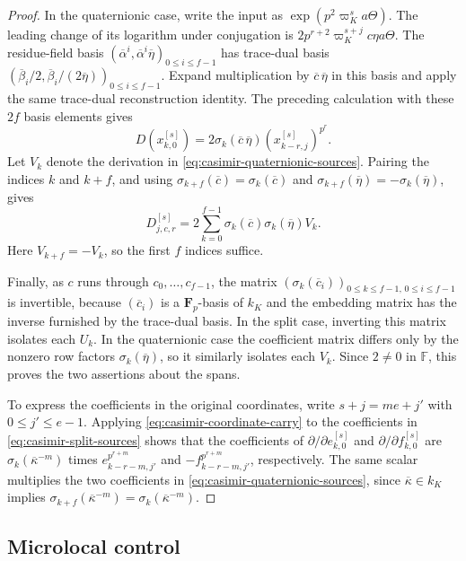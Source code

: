 \documentclass[11pt]{article}
\numberwithin{equation}{section}
\theoremstyle{definition}
\theoremstyle{remark}
\newcommand{\F}{\mathbb F}
\begin{document}
\begin{proof}
In the quaternionic case, write the input as
$\exp(p^2\varpi_K^s a\Theta)$. The leading change of its logarithm under conjugation is
$2p^{r+2}\varpi_K^{s+j}c\eta a\Theta$.
The residue-field basis
$(\overline\alpha^i,\overline\alpha^i\overline\eta)_{0\leq i\leq f-1}$
has trace-dual basis
$(\overline\beta_i/2,\overline\beta_i/(2\overline\eta))_{0\leq i\leq f-1}$.
Expand multiplication by $\overline c\,\overline\eta$ in this
basis and apply the same trace-dual reconstruction identity.
The preceding calculation with these $2f$ basis elements gives
\[
 D(x_{k,0}^{[s]})
   =2\sigma_k(\overline c\,\overline\eta)
                   (x_{k-r,j}^{[s]})^{p^r}.
\]
Let $V_k$ denote the derivation in
\eqref{eq:casimir-quaternionic-sources}. Pairing the indices $k$
and $k+f$, and using
$\sigma_{k+f}(\overline c)=\sigma_k(\overline c)$ and
$\sigma_{k+f}(\overline\eta)=-\sigma_k(\overline\eta)$, gives
\[
 D^{[s]}_{j,c,r}
   =2\sum_{k=0}^{f-1}\sigma_k(\overline c)
                         \sigma_k(\overline\eta)V_k.
\]
Here $V_{k+f}=-V_k$, so the first $f$ indices suffice.

Finally, as $c$ runs through $c_0,\ldots,c_{f-1}$, the matrix
$(\sigma_k(\overline c_i))_{0\leq k\leq f-1,\,0\leq i\leq f-1}$ is
invertible, because $(\overline c_i)$ is a $\mathbf F_p$-basis of
$k_K$ and the embedding matrix has the inverse furnished by the
trace-dual basis. In the split case, inverting this matrix isolates
each $U_k$. In the quaternionic case the coefficient matrix differs
only by the nonzero row factors $\sigma_k(\overline\eta)$, so it
similarly isolates each $V_k$. Since $2\ne0$ in $\F$, this proves
the two assertions about the spans.

To express the coefficients in the original coordinates, write
$s+j=me+j'$ with $0\leq j'\leq e-1$.
Applying \eqref{eq:casimir-coordinate-carry} to the coefficients in
\eqref{eq:casimir-split-sources} shows that the coefficients of
$\partial/\partial e_{k,0}^{[s]}$ and
$\partial/\partial f_{k,0}^{[s]}$ are
$\sigma_k(\overline\kappa^{-m})$ times
$e_{k-r-m,j'}^{p^{r+m}}$ and $-f_{k-r-m,j'}^{p^{r+m}}$,
respectively. The same scalar multiplies the two coefficients
in \eqref{eq:casimir-quaternionic-sources}, since
$\overline\kappa\in k_K$ implies
$\sigma_{k+f}(\overline\kappa^{-m})
=\sigma_k(\overline\kappa^{-m})$.
\end{proof}

\subsection{Microlocal control}
\label{subsec:casimir-local-control}
\end{document}

